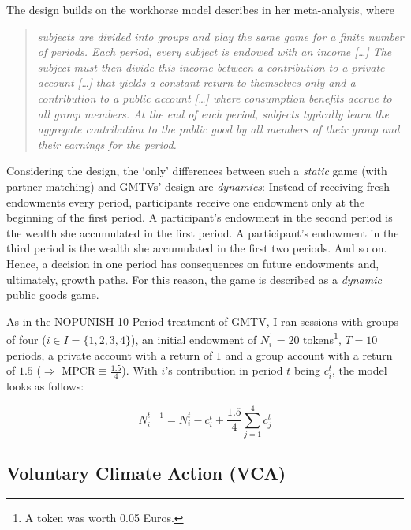 \documentclass[
  authoryear,
  review,
  3p,
  onecolumn]{elsarticle}
\begin{document}
The design builds on the workhorse model \citet[p.301]{Zelmer2003}
describes in her meta-analysis, where

\begin{quote}
\emph{subjects are divided into groups and play the same game for a
finite number of periods. Each period, every subject is endowed with an
income {[}\ldots{]} The subject must then divide this income between a
contribution to a private account {[}\ldots{]} that yields a constant
return to themselves only and a contribution to a public account
{[}\ldots{]} where consumption benefits accrue to all group members. At
the end of each period, subjects typically learn the aggregate
contribution to the public good by all members of their group and their
earnings for the period.}
\end{quote}

Considering the design, the `only' differences between such a
\emph{static} game (with partner matching) and GMTVs' design are
\emph{dynamics}: Instead of receiving fresh endowments every period,
participants receive one endowment only at the beginning of the first
period. A participant's endowment in the second period is the wealth she
accumulated in the first period. A participant's endowment in the third
period is the wealth she accumulated in the first two periods. And so
on. Hence, a decision in one period has consequences on future
endowments and, ultimately, growth paths. For this reason, the game is
described as a \emph{dynamic} public goods game.

As in the NOPUNISH 10 Period treatment of GMTV, I ran sessions with
groups of four (\(i \in I=\{1,2,3,4\}\)), an initial endowment of
\(N_i^1 = 20\) tokens\footnote{A token was worth 0.05 Euros.}, \(T=10\)
periods, a private account with a return of \(1\) and a group account
with a return of \(1.5\) (\(\Rightarrow\) MPCR\(\equiv \frac{1.5}{4}\)).
With \(i\)'s contribution in period \(t\) being \(c_i^t\), the model
looks as follows:

\[
N_i^{t+1}=N_i^t - c_i^t + \frac{1.5}{4}\sum_{j=1}^4 c_j^t
\]

\hypertarget{voluntary-climate-action-vca}{%
\subsection{Voluntary Climate Action
(VCA)}\label{voluntary-climate-action-vca}}
\end{document}
